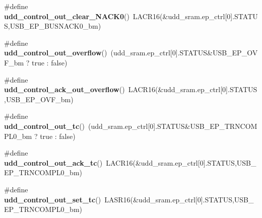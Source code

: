 \begin{DoxyCompactItemize}
\item 
\hypertarget{group__udd__xmega__usb__group_ga655ecf1ac8367ac647ff972fb403b535}{\#define {\bfseries udd\-\_\-control\-\_\-out\-\_\-clear\-\_\-\-N\-A\-C\-K0}()~L\-A\-C\-R16(\&udd\-\_\-sram.\-ep\-\_\-ctrl\mbox{[}0\mbox{]}.S\-T\-A\-T\-U\-S,U\-S\-B\-\_\-\-E\-P\-\_\-\-B\-U\-S\-N\-A\-C\-K0\-\_\-bm)}\label{group__udd__xmega__usb__group_ga655ecf1ac8367ac647ff972fb403b535}

\item 
\hypertarget{group__udd__xmega__usb__group_gaa7bb755967f3e3be07e584bbbde99fbf}{\#define {\bfseries udd\-\_\-control\-\_\-out\-\_\-overflow}()~(udd\-\_\-sram.\-ep\-\_\-ctrl\mbox{[}0\mbox{]}.S\-T\-A\-T\-U\-S\&U\-S\-B\-\_\-\-E\-P\-\_\-\-O\-V\-F\-\_\-bm ? true \-: false)}\label{group__udd__xmega__usb__group_gaa7bb755967f3e3be07e584bbbde99fbf}

\item 
\hypertarget{group__udd__xmega__usb__group_ga6efab86ee705f097b504bb11e7539553}{\#define {\bfseries udd\-\_\-control\-\_\-ack\-\_\-out\-\_\-overflow}()~L\-A\-C\-R16(\&udd\-\_\-sram.\-ep\-\_\-ctrl\mbox{[}0\mbox{]}.S\-T\-A\-T\-U\-S,U\-S\-B\-\_\-\-E\-P\-\_\-\-O\-V\-F\-\_\-bm)}\label{group__udd__xmega__usb__group_ga6efab86ee705f097b504bb11e7539553}

\item 
\hypertarget{group__udd__xmega__usb__group_ga62b17a12d9e3993332a2649ad406a95d}{\#define {\bfseries udd\-\_\-control\-\_\-out\-\_\-tc}()~(udd\-\_\-sram.\-ep\-\_\-ctrl\mbox{[}0\mbox{]}.S\-T\-A\-T\-U\-S\&U\-S\-B\-\_\-\-E\-P\-\_\-\-T\-R\-N\-C\-O\-M\-P\-L0\-\_\-bm ? true \-: false)}\label{group__udd__xmega__usb__group_ga62b17a12d9e3993332a2649ad406a95d}

\item 
\hypertarget{group__udd__xmega__usb__group_ga96697fdb1bcc8da969bdb34ffb44b084}{\#define {\bfseries udd\-\_\-control\-\_\-out\-\_\-ack\-\_\-tc}()~L\-A\-C\-R16(\&udd\-\_\-sram.\-ep\-\_\-ctrl\mbox{[}0\mbox{]}.S\-T\-A\-T\-U\-S,U\-S\-B\-\_\-\-E\-P\-\_\-\-T\-R\-N\-C\-O\-M\-P\-L0\-\_\-bm)}\label{group__udd__xmega__usb__group_ga96697fdb1bcc8da969bdb34ffb44b084}

\item 
\hypertarget{group__udd__xmega__usb__group_ga620d4d9b5a1758b094615e512e12ba54}{\#define {\bfseries udd\-\_\-control\-\_\-out\-\_\-set\-\_\-tc}()~L\-A\-S\-R16(\&udd\-\_\-sram.\-ep\-\_\-ctrl\mbox{[}0\mbox{]}.S\-T\-A\-T\-U\-S,U\-S\-B\-\_\-\-E\-P\-\_\-\-T\-R\-N\-C\-O\-M\-P\-L0\-\_\-bm)}\label{group__udd__xmega__usb__group_ga620d4d9b5a1758b094615e512e12ba54}


\end{DoxyCompactItemize}
